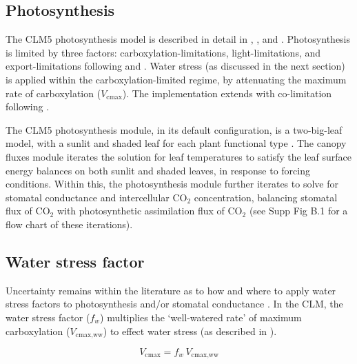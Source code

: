 \documentclass[draft,linenumbers]{agujournal}
\begin{document}
\subsection{Photosynthesis}
\label{sect:A}
    The CLM5 photosynthesis model is described in detail in \citet{bonan2011}, \citet{thornton2007},
    and \citet{oleson2013}. Photosynthesis is limited by three factors: carboxylation-limitations, light-limitations, and export-limitations 
    following \citet{farquhar1980} and \citet{harley1992}. Water stress (as discussed in the next section) is applied within the carboxylation-limited regime, by attenuating the maximum rate of carboxylation ($V_{\text{cmax}}$). The implementation extends \citet{sellers1996a,sellers1996b} with 
    co-limitation following \citet{collatz1991}. 
    
    The CLM5 photosynthesis module, in its default configuration, is a two-big-leaf model, with a sunlit and shaded leaf for each plant functional type \citep{thornton2007, dai2004, oleson2013}. 
    The canopy fluxes module iterates the solution for leaf temperatures to satisfy the leaf surface energy balances on both sunlit and shaded leaves, in response to forcing conditions.
    Within this, the photosynthesis module further iterates to solve for stomatal conductance and intercellular CO$_2$ concentration, balancing stomatal flux of CO$_2$ with photosynthetic assimilation flux of CO$_2$ (see Supp Fig B.1 for a flow chart of these iterations).


\subsection{Water stress factor}
\label{sect:wsf}
     Uncertainty remains within the literature as to how and where to apply water stress factors to photosynthesis and/or stomatal conductance 
    \citep{zhou2013,novick2016a,sperry2015}.
    In the CLM, the water stress factor ($f_w$) multiplies the `well-watered rate' of maximum carboxylation ($V_{\text{cmax,ww}}$) to effect water stress (as described in \citet{oleson2013}). 
    
    \begin{equation}
    V_{\text{cmax}} = f_w\, V_{\text{cmax,ww}} 
    \end{equation}
\end{document}
